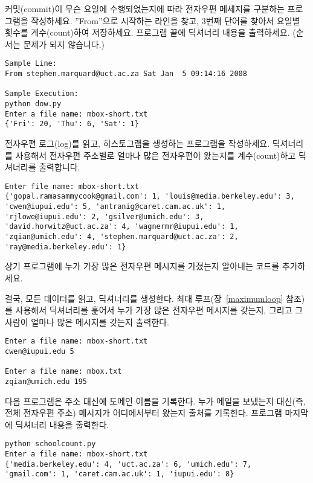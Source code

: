 \begin{ex}

커밋(commit)이 무슨 요일에 수행되었는지에 따라 전자우편 메세지를 구분하는 프로그램을 작성하세요.
''From''으로 시작하는 라인을 찾고, 3번째 단어를 찾아서 요일별 횟수를 계수(count)하여 저장하세요.
프로그램 끝에 딕셔너리 내용을 출력하세요. (순서는 문제가 되지 않습니다.)

\beforeverb
\begin{verbatim}
Sample Line:
From stephen.marquard@uct.ac.za Sat Jan  5 09:14:16 2008

Sample Execution:
python dow.py
Enter a file name: mbox-short.txt
{'Fri': 20, 'Thu': 6, 'Sat': 1}
\end{verbatim}
\afterverb
\end{ex}

\begin{ex}
전자우편 로그(log)를 읽고, 히스토그램을 생성하는 프로그램을 작성하세요.
딕셔너리를 사용해서 전자우편 주소별로 얼마나 많은 전자우편이 왔는지를 계수(count)하고 딕셔너리를 출력합니다.

\beforeverb
\begin{verbatim}
Enter file name: mbox-short.txt
{'gopal.ramasammycook@gmail.com': 1, 'louis@media.berkeley.edu': 3, 
'cwen@iupui.edu': 5, 'antranig@caret.cam.ac.uk': 1, 
'rjlowe@iupui.edu': 2, 'gsilver@umich.edu': 3, 
'david.horwitz@uct.ac.za': 4, 'wagnermr@iupui.edu': 1, 
'zqian@umich.edu': 4, 'stephen.marquard@uct.ac.za': 2, 
'ray@media.berkeley.edu': 1}
\end{verbatim}
\afterverb
\end{ex}

\begin{ex}

상기 프로그램에 누가 가장 많은 전자우편 메시지를 가졌는지 알아내는 코드를 추가하세요.

결국, 모든 데이터를 읽고, 딕셔너리를 생성한다. 
최대 루프(장~\ref{maximumloop} 참조)를 사용해서 딕셔너리를 훑어서 누가 가장 많은 전자우편 메시지를 갖는지, 
그리고 그 사람이 얼마나 많은 메시지를 갖는지 출력한다.


\beforeverb
\begin{verbatim}
Enter a file name: mbox-short.txt
cwen@iupui.edu 5

Enter a file name: mbox.txt
zqian@umich.edu 195
\end{verbatim}
\afterverb
\end{ex}

\begin{ex}
다음 프로그램은 주소 대신에 도메인 이름을 기록한다. 
누가 메일을 보냈는지 대신(즉, 전체 전자우편 주소) 메시지가 어디에서부터 왔는지 출처를 기록한다.
프로그램 마지막에 딕셔너리 내용을 출력한다.

\beforeverb
\begin{verbatim}
python schoolcount.py
Enter a file name: mbox-short.txt
{'media.berkeley.edu': 4, 'uct.ac.za': 6, 'umich.edu': 7, 
'gmail.com': 1, 'caret.cam.ac.uk': 1, 'iupui.edu': 8}
\end{verbatim}
\afterverb
\end{ex}

